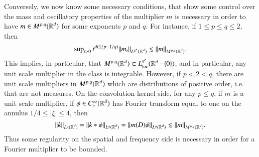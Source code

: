 %
%
%
%
Conversely, we now know some necessary conditions, that show some control over the mass and oscillatory properties of the multiplier $m$ is necessary in order to have $m \in M^{p,q}(\operatorname{\mathbb{R}}^d)$ for some exponents $p$ and $q$. For instance, if $1 \leq p \leq q \leq 2$, then
%
\[ \sup\nolimits_{t > 0} t^{d(1/p - 1/q)} \| m_t \|_{L^{q^*}(\operatorname{\mathbb{R}}^d)} \lesssim \| m \|_{M^{p,q}(\operatorname{\mathbb{R}}^d)}. \]
%
This implies, in particular, that $M^{p,q}(\operatorname{\mathbb{R}}^d) \subset L^{q^*}_{\text{loc}}(\operatorname{\mathbb{R}}^d - \{ 0 \})$, and in particular, any unit scale multiplier in the class is integrable. However, if $p < 2 < q$, there are unit scale multipliers in $M^{p,q}(\operatorname{\mathbb{R}}^d)$ which are distributions of positive order, i.e. that are not measures. On the convolution kernel side, for any $p \leq q$, if $m$ is a unit scale multiplier, if $\phi \in C_c^\infty(\operatorname{\mathbb{R}}^d)$ has Fourier transform equal to one on the annulus $1/4 \leq |\xi| \leq 4$, then
%
\[ \| k \|_{L^q(\operatorname{\mathbb{R}}^d)} = \| k * \phi \|_{L^q(\operatorname{\mathbb{R}}^d)} = \| m(D) \phi \|_{L^q(\operatorname{\mathbb{R}}^d)} \lesssim \| m \|_{M^{p,q}(\operatorname{\mathbb{R}}^d)}. \]
%
Thus some regularity on the spatial and frequency side is necessary in order for a Fourier multiplier to be bounded.

